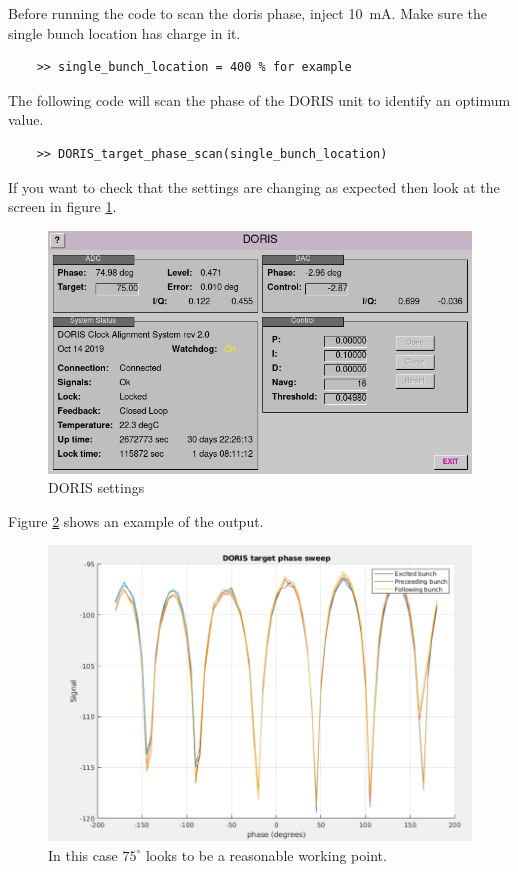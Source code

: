 \documentclass{report}
\begin{document}
Before running the code to scan the doris phase, inject 10~mA.
Make sure the single bunch location has charge in it.
\begin{verbatim}
    >> single_bunch_location = 400 % for example
\end{verbatim}
The following code will scan the phase of the DORIS unit to identify an optimum value.
\begin{verbatim}
    >> DORIS_target_phase_scan(single_bunch_location) 
\end{verbatim}
If you want to check that the settings are changing as expected then look at the screen in figure \ref{fig:DORIS_settings}.
\begin{figure}
    \centering
    \includegraphics[width=0.8\linewidth]{DORIS_settings.png}
    \caption{DORIS settings}
    \label{fig:DORIS_settings}
\end{figure}

Figure \ref{fig:DORIS_phase_scan} shows an example of the output.
\begin{figure}[ht]
    \centering
    \includegraphics[width=0.8\linewidth]{DORIS_scan.png}
    \caption{In this case $75^\circ$ looks to be a reasonable working point.}
    \label{fig:DORIS_phase_scan}
\end{figure}
\end{document}
